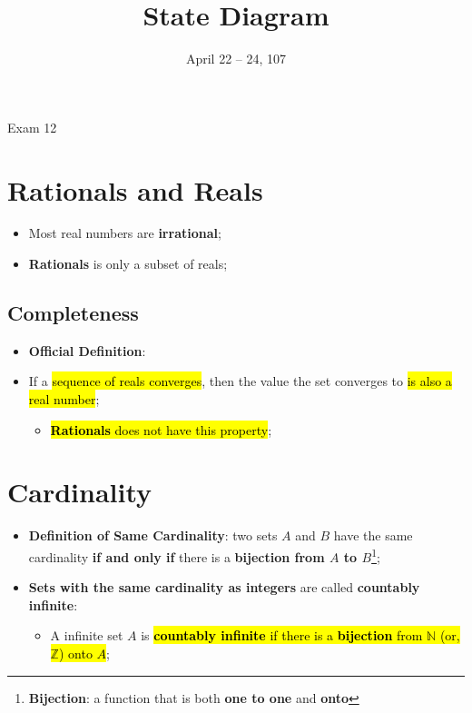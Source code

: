 \documentclass{note}
\date{April 22 -- 24, 107}
\title{State Diagram}
\begin{document}
\begin{note}{Exam 12}

\section{Rationals and Reals}

\begin{itemize}
    \item Most real numbers are \textbf{irrational};
    \item \textbf{Rationals} is only a subset of reals;
\end{itemize}

    \subsection{Completeness}
    
    \begin{itemize}
        \item \textbf{Official Definition}: 
        
        \item If a \hl{sequence of reals converges}, then the value the set converges to \hl{is also a real number};
        \begin{itemize}
            \item \hl{\textbf{Rationals} does not have this property};
        \end{itemize}
    \end{itemize}
    
\section{Cardinality}

\begin{itemize}
    \item \textbf{Definition of Same Cardinality}: two sets $ A $ and $ B $ have the same cardinality \textbf{if and only if}
    there is a \textbf{bijection from $ A $ to $ B $}\footnote{\textbf{Bijection}: a function that is both \textbf{one to one} 
    and \textbf{onto}};
    
    \item \textbf{Sets with the same cardinality as integers} are called \textbf{countably infinite}:
    \begin{itemize}
        \item A infinite set $ A $ is \hl{\textbf{countably infinite} if there is a \textbf{bijection} from 
        $ \mathbb{N} $ (or, $ \mathbb{Z} $) onto $ A $};
    \end{itemize} 
    

\end{itemize}
\end{note}
\end{document}
